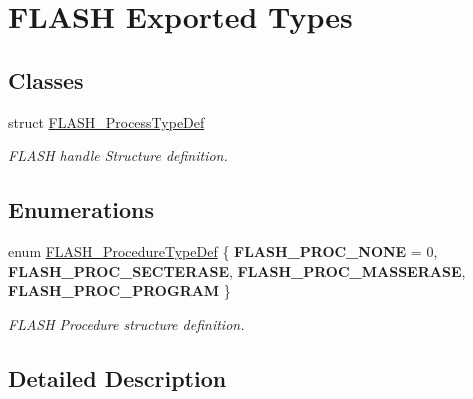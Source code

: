 \hypertarget{group___f_l_a_s_h___exported___types}{}\section{F\+L\+A\+SH Exported Types}
\label{group___f_l_a_s_h___exported___types}
\subsection*{Classes}
\begin{DoxyCompactItemize}
\item 
struct \hyperlink{struct_f_l_a_s_h___process_type_def}{F\+L\+A\+S\+H\+\_\+\+Process\+Type\+Def}
\begin{DoxyCompactList}\small\item\em F\+L\+A\+SH handle Structure definition. \end{DoxyCompactList}\end{DoxyCompactItemize}
\subsection*{Enumerations}
\begin{DoxyCompactItemize}
\item 
enum \hyperlink{group___f_l_a_s_h___exported___types_ga2b0268387bc11bcab76be9ce7c43eaaf}{F\+L\+A\+S\+H\+\_\+\+Procedure\+Type\+Def} \{ {\bfseries F\+L\+A\+S\+H\+\_\+\+P\+R\+O\+C\+\_\+\+N\+O\+NE} = 0, 
{\bfseries F\+L\+A\+S\+H\+\_\+\+P\+R\+O\+C\+\_\+\+S\+E\+C\+T\+E\+R\+A\+SE}, 
{\bfseries F\+L\+A\+S\+H\+\_\+\+P\+R\+O\+C\+\_\+\+M\+A\+S\+S\+E\+R\+A\+SE}, 
{\bfseries F\+L\+A\+S\+H\+\_\+\+P\+R\+O\+C\+\_\+\+P\+R\+O\+G\+R\+AM}
 \}\hypertarget{group___f_l_a_s_h___exported___types_ga2b0268387bc11bcab76be9ce7c43eaaf}{}\label{group___f_l_a_s_h___exported___types_ga2b0268387bc11bcab76be9ce7c43eaaf}
\begin{DoxyCompactList}\small\item\em F\+L\+A\+SH Procedure structure definition. \end{DoxyCompactList}
\end{DoxyCompactItemize}


\subsection{Detailed Description}
